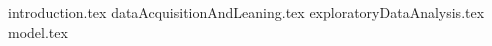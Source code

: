 \documentclass[11pt,oneside]{book}%
\begin{document}
	\maketitle
	\frontmatter
	\mainmatter
	{introduction.tex}
	{dataAcquisitionAndLeaning.tex}
	{exploratoryDataAnalysis.tex}
	{model.tex}
%	
%	
\end{document}
